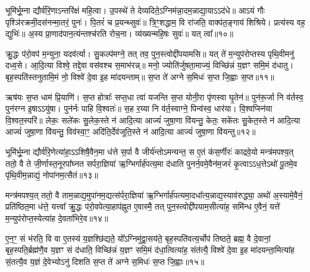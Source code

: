 {\anuvakamend[{आ\-ऽप॑राभावाय पुरो॒डाश॑मे॒ते आहु॑ती॒ तत॒ष्षट्त्रिꣳ॑शच्च॥२॥}]}

भूमि॑र्भू॒म्ना द्यौर्व॑रि॒णा\-ऽन्तरि॑क्षं महि॒त्वा। उ॒पस्थे॑ ते देव्यदिते॒\-ऽग्निम॑न्ना॒दम॒न्नाद्या॒या\-ऽ\-ऽद॑धे॥ आ\-ऽयं गौः पृश्ञि॑रक्रमी॒दस॑नन्मा॒तरं॒ पुनः॑। पि॒तरं॑ च प्र॒यन्थ्सुवः॑॥ त्रि॒ꣳ॒शद्धाम॒ वि रा॑जति॒ वाक्प॑त॒ङ्गाय॑ शिश्रिये। प्रत्य॑स्य वह॒ द्युभिः॑॥ अ॒स्य प्रा॒णाद॑पान॒त्य॑न्तश्च॑रति रोच॒ना। व्य॑ख्यन्महि॒षः सुवः॑॥ यत् त्वा᳚॥१०॥

क्रु॒द्धः प॑रो॒वप॑ म॒न्युना॒ यदव॑र्त्या। सु॒कल्प॑मग्ने॒ तत् तव॒ पुन॒स्त्वोद्दी॑पयामसि॥ यत् ते॑ म॒न्युप॑रोप्तस्य पृथि॒वीमनु॑ दध्व॒से। आ॒दि॒त्या विश्वे॒ तद्दे॒वा वस॑वश्च स॒माभ॑रन्न्॥ मनो॒ ज्योति॑र्जुषता॒माज्यं॒ विच्छि॑न्नं य॒ज्ञꣳ समि॒मं द॑धातु। बृह॒स्पति॑स्तनुतामि॒मं नो॒ विश्वे॑ दे॒वा इ॒ह मा॑दयन्ताम्॥ स॒प्त ते॑ अग्ने स॒मिधः॑ स॒प्त जि॒ह्वाः स॒प्त॥११॥

ऋष॑यः स॒प्त धाम॑ प्रि॒याणि॑। स॒प्त होत्राः᳚ सप्त॒धा त्वा॑ यजन्ति स॒प्त योनी॒रा पृ॑णस्वा घृ॒तेन॑॥ पुन॑रू॒र्जा नि व॑र्तस्व॒ पुन॑रग्न इ॒षा\-ऽ\-ऽयु॑षा। पुन॑र्नः पाहि वि॒श्वतः॑॥ स॒ह र॒य्या नि व॑र्त॒स्वाग्ने॒ पिन्व॑स्व॒ धार॑या। वि॒श्वप्स्नि॑या वि॒श्वत॒स्परि॑॥ लेकः॒ सले॑कः सु॒लेक॒स्ते न॑ आदि॒त्या आज्यं॑ जुषा॒णा वि॑यन्तु॒ केतः॒ सके॑तः सु॒केत॒स्ते न॑ आदि॒त्या आज्यं॑ जुषा॒णा वि॑यन्तु॒ विव॑स्वा॒ꣳ॒ अदि॑ति॒र्देव॑जूति॒स्ते न॑ आदि॒त्या आज्यं॑ जुषा॒णा वि॑यन्तु॥१२॥

{\anuvakamend[{त्वा॒ जि॒ह्वाः स॒प्त सु॒केत॒स्ते न॒स्त्रयो॑दश च॥३॥}]}

भूमि॑र्भू॒म्ना द्यौर्व॑रि॒णेत्या॑हा॒\-ऽ\-ऽशिषै॒वैन॒मा ध॑त्ते स॒र्पा वै जीर्य॑न्तो\-ऽमन्यन्त॒ स ए॒तं क॑स॒र्णीरः॑ काद्रवे॒यो मन्त्र॑मपश्य॒त् ततो॒ वै ते जी॒र्णास्त॒नूरपा᳚घ्नत सर्परा॒ज्ञिया॑ ऋ॒ग्भिर्गार्\mbox{}ह॑पत्य॒मा द॑धाति पुनर्न॒वमे॒वैन॑म॒जरं॑ कृ॒त्वा\-ऽ\-ऽध॒त्ते\-ऽथो॑ पू॒तमे॒व पृ॑थि॒वीम॒न्नाद्यं॒ नोपा॑नम॒त्सैतं॥१३॥

मन्त्र॑मपश्य॒त् ततो॒ वै ताम॒न्नाद्य॒मुपा॑नम॒द्यत्स॑र्परा॒ज्ञिया॑ ऋ॒ग्भिर्गार्\mbox{}ह॑पत्यमा॒दधा᳚त्य॒न्नाद्य॒स्याव॑रुद्ध्या॒ अथो॑ अ॒स्यामे॒वैनं॒ प्रति॑ष्ठित॒मा ध॑त्ते॒ यत्त्वा᳚ क्रु॒द्धः प॑रो॒वपेत्या॒हाप॑ह्नुत ए॒वास्मै॒ तत् पुन॒स्त्वोद्दी॑पयाम॒सीत्या॑ह॒ समि॑न्ध ए॒वैनं॒ यत्ते॑ म॒न्युप॑रोप्त॒स्येत्या॑ह दे॒वता॑भिरे॒व॥१४॥

ए॒न॒ꣳ॒ सं भ॑रति॒ वि वा ए॒तस्य॑ य॒ज्ञश्छि॑द्यते॒ यो᳚\-ऽग्निमु॑द्वा॒सय॑ते॒ बृह॒स्पति॑वत्य॒र्चोप॑ तिष्ठते॒ ब्रह्म॒ वै दे॒वानां॒ बृह॒स्पति॒र्ब्रह्म॑णै॒व य॒ज्ञꣳ सं द॑धाति॒ विच्छि॑न्नं य॒ज्ञꣳ समि॒मं द॑धा॒त्वित्या॑ह॒ संत॑त्यै॒ विश्वे॑ दे॒वा इ॒ह मा॑दयन्ता॒मित्या॑ह सं॒तत्यै॒व य॒ज्ञं दे॒वेभ्यो\-ऽनु॑ दिशति स॒प्त ते॑ अग्ने स॒मिधः॑ स॒प्त जि॒ह्वाः॥१५॥

